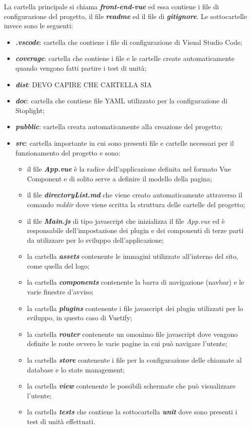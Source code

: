 La cartella principale si chiama \textbf{\textit{front-end-vue}} ed essa contiene i file di configurazione del progetto, il file \textbf{\textit{readme}} ed il file di \textbf{\textit{gitignore}}. Le sottocartelle invece sono le seguenti:
\begin{itemize}
	\item \textbf{\textit{.vscode}}: cartella che contiene i file di configurazione di Visual Studio Code;
	\item \textbf{\textit{coverage}}: cartella che contiene i file e le cartelle create automaticamente quando vengono fatti partire i test di unità;
	\item \textbf{\textit{dist}}: DEVO CAPIRE CHE CARTELLA SIA
	\item \textbf{\textit{doc}}: cartella che contiene file YAML utilizzato per la configurazione di Stoplight;
	\item \textbf{\textit{pubblic}}: cartella creata automaticamente alla creazione del progetto;
	\item \textbf{\textit{src}}: cartella importante in cui sono presenti file e cartelle necessari per il funzionamento del progetto e sono:
	\begin{itemize}
		\item il file \textbf{\textit{App.vue}} è la radice dell'applicazione definita nel formato Vue Component e di solito serve a definire il modello della pagina;
		\item il file \textbf{\textit{directoryList.md}} che viene creato automaticamente attraverso il comando \textit{mddir} dove viene scritta la struttura delle cartelle del progetto;
		\item il file \textbf{\textit{Main.js}} di tipo javascript che inizializza il file \textit{App.vue} ed è responsabile dell'impostazione dei plugin e dei componenti di terze parti da utilizzare per lo sviluppo dell'applicazione;
		\item la cartella \textbf{\textit{assets}} contenente le immagini utilizzate all'interno del sito, come quella del logo;
		\item la cartella \textbf{\textit{components}} contenente la barra di navigazione (navbar) e le varie finestre d'avviso;
		\item la cartella \textbf{\textit{plugins}} contenente i file javascript dei plugin utilizzati per lo sviluppo, in questo caso di Vuetify;
		\item la cartella \textbf{\textit{router}} contenente un omonimo file javascript dove vengono definite le route ovvero le varie pagine in cui può navigare l'utente;
		\item la cartella \textbf{\textit{store}} contenente i file per la configurazione delle chiamate al database e lo state management;
		\item la cartella \textbf{\textit{view}} contenente le possibili schermate che può visualizzare l'utente;
		\item la cartella \textbf{\textit{tests}} che contiene la sottocartella \textbf{\textit{unit}} dove sono presenti i test di unità effettuati.
	\end{itemize}
\end{itemize}

